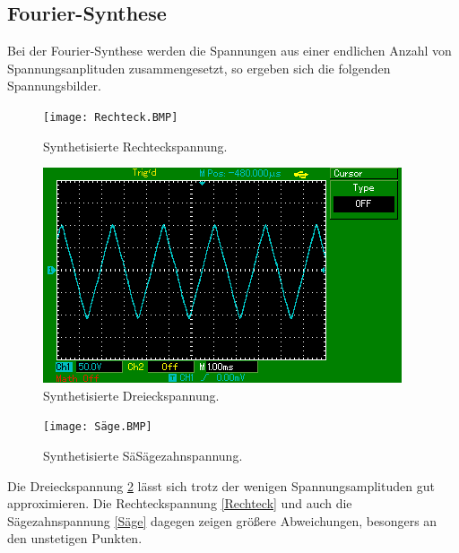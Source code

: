 \subsection{Fourier-Synthese}
Bei der Fourier-Synthese werden die Spannungen aus einer endlichen Anzahl von
Spannungsanplituden zusammengesetzt, so ergeben sich die folgenden Spannungsbilder.
\begin{figure}[H]
  \texttt{[image: Rechteck.BMP]}
  \caption{Synthetisierte Rechteckspannung.}
  \label{fig:Rechteck}
\end{figure}

\begin{figure}[H]
  \includegraphics{Dreieck.BMP}
  \caption{Synthetisierte Dreieckspannung.}
  \label{fig:Dreieck}
\end{figure}

\begin{figure}
  \texttt{[image: Säge.BMP]}
  \caption{Synthetisierte SäSägezahnspannung.}
  \label{fig:Säge}
\end{figure}

Die Dreieckspannung \ref{fig:Dreieck} lässt sich trotz der wenigen Spannungsamplituden
gut approximieren. Die Rechteckspannung \ref{Rechteck} und auch die
Sägezahnspannung \ref{Säge} dagegen zeigen größere Abweichungen, besongers
an den unstetigen Punkten.

